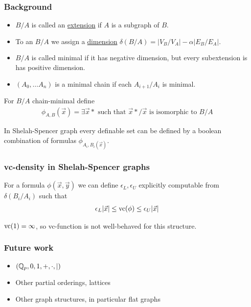 \documentclass{beamer}
\newcommand{\defn}{\underline}
\begin{document}
\begin{frame}
	\frametitle{Background}
\begin{Definition}
	\begin{itemize}
		\item $B/A$ is called an \defn{extension} if $A$ is a subgraph of $B$.
		\item To an $B/A$ we assign a \defn{dimension} $\delta(B/A) = |V_B/V_A| - \alpha |E_B/E_A|$.
		\item $B/A$ is called minimal if it has negative dimension, but every subextension is has positive dimension.
		\item $(A_0, \ldots A_n)$ is a minimal chain if each $A_{i + 1}/A_i$ is minimal.
	\end{itemize}
\end{Definition}
	For $B/A$ chain-minimal define
	\begin{align*}
		\phi_{A,B}(\vec x) = \exists \vec x* \text { such that $\vec x*/\vec x$ is isomorphic to $B/A$}
	\end{align*}
	\begin{Theorem} 
		In Shelah-Spencer graph every definable set can be defined by a boolean combination of formulas $\phi_{A_i, B_i(\vec x)}$.
	\end{Theorem}
\end{frame}

\begin{frame}
	\frametitle{vc-density in Shelah-Spencer graphs}
	\begin{Theorem} [B., '15]
		For a formula $\phi(\vec x, \vec y)$ we can define $\epsilon_L, \epsilon_U$ explicitly computable from $\delta(B_i/A_i)$ such that
			\begin{align*}
				\epsilon_L |\vec x| \leq \operatorname{vc}(\phi) \leq \epsilon_U |\vec x|
			\end{align*}
	\end{Theorem}
	\begin{Corollary}
		$\operatorname{vc}(1) = \infty$, so vc-function is not well-behaved for this structure.
	\end{Corollary}
\end{frame}

\begin{frame}
	\frametitle{Future work}
	\begin{itemize}
		\item $(\mathbb{Q}_p, 0, 1, +, \cdot, \mid)$
		\item Other partial orderings, lattices
		\item Other graph structures, in particular flat graphs
	\end{itemize}
\end{frame}
\end{document}

